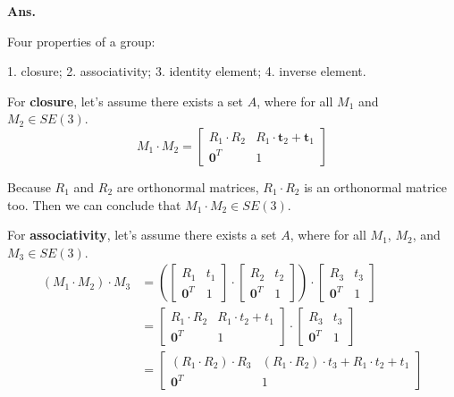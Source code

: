 \documentclass[12pt, a4paper, UTF8, fontset=windows]{ctexbook}
\newenvironment{solution}{\par\noindent\textbf{Ans.}}{\par}
\begin{document}
\begin{solution}

    Four properties of a group:

    1. closure; 2. associativity; 3. identity element; 4. inverse element.

    For \textbf{closure}, let's assume there exists a set $A$, where for all $M_1$ and $M_2 \in SE(3)$. 
    $$
    M_1 \cdot M_2 = 
    \left[\begin{array}{cc}
    R_{1} \cdot R_{2} & R_{1} \cdot \mathbf{t}_{2} + \mathbf{t}_{1} \\
    \mathbf{0}^{T} & 1
    \end{array}
    \right]
    $$

    Because $R_1$ and $R_2$ are orthonormal matrices, $R_1 \cdot R_2$ is an orthonormal matrice too.
    Then we can conclude that $ M_1 \cdot M_2 \in SE(3)$.

    For \textbf{associativity}, let's assume there exists a set $A$, where for all $M_1$, $M_2$, and $M_3 \in SE(3)$. 
    $$
    \begin{aligned}
    (M_1 \cdot M_2) \cdot M_3 
    &= \left(\begin{bmatrix} R_1 & t_1 \\ \mathbf{0}^T & 1 \end{bmatrix} \cdot \begin{bmatrix} R_2 & t_2 \\ \mathbf{0}^T & 1 \end{bmatrix}\right) \cdot \begin{bmatrix} R_3 & t_3 \\ \mathbf{0}^T & 1 \end{bmatrix} \\
    &= \begin{bmatrix} R_1 \cdot R_2 & R_1 \cdot t_2 + t_1 \\ \mathbf{0}^T & 1 \end{bmatrix} \cdot \begin{bmatrix} R_3 & t_3 \\ \mathbf{0}^T & 1 \end{bmatrix} \\
    &= \begin{bmatrix} (R_1 \cdot R_2) \cdot R_3 & (R_1 \cdot R_2) \cdot t_3 + R_1 \cdot t_2 + t_1 \\ \mathbf{0}^T & 1 \end{bmatrix}
    \end{aligned}
    $$


\end{solution}
\end{document}
